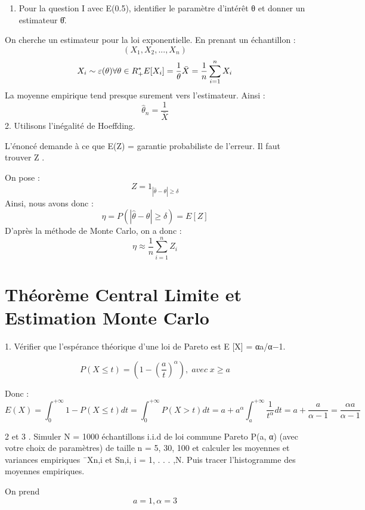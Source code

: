 \documentclass[
]{article}
\providecommand{\tightlist}{%
  \setlength{\itemsep}{0pt}\setlength{\parskip}{0pt}}
\begin{document}
\begin{enumerate}
\def\labelenumi{\arabic{enumi}.}
\tightlist
\item
  Pour la question I avec E(0.5), identifier le paramètre d'intérêt θ et
  donner un estimateur θ̂.
\end{enumerate}

On cherche un estimateur pour la loi exponentielle. En prenant un
échantillon : \[
(X_1,X_2,...,X_n)
\] \[
X_i \sim \varepsilon(\theta) 
\\
\forall \theta \in R^*_+
\\
E[X_i] = \frac{1}{\theta}
\\
\bar{X} = \frac{1}{n} \sum_{i=1}^{n} X_i
\] La moyenne empirique tend presque surement vers l'estimateur. Ainsi :
\[
\hat{\theta}_n = \frac{1}{\bar{X}}
\] 2. Utilisons l'inégalité de Hoeffding.

L'énoncé demande à ce que E(Z) = garantie probabiliste de l'erreur. Il
faut trouver Z .

On pose : \[
Z = 1_{|\hat{\theta} - \theta| \ge \delta} 
\] Ainsi, nous avons donc : \[
\eta = P(|\hat{\theta} - \theta| \ge \delta) = E[Z]
\] D'après la méthode de Monte Carlo, on a donc : \[
\eta \approx  \frac{1}{n} \sum_{i=1}^n Z_i
\]

\hypertarget{thuxe9oruxe8me-central-limite-et-estimation-monte-carlo}{%
\section{Théorème Central Limite et Estimation Monte
Carlo}\label{thuxe9oruxe8me-central-limite-et-estimation-monte-carlo}}

1. Vérifier que l'espérance théorique d'une loi de Pareto est E {[}X{]}
= αa/α−1.

\[
P(X\le t)= (1-\left( \frac{a}{t} \right)^{\alpha}) , \;avec \;x \ge a
\]

Donc : \[
E(X) = \int_0^{+\infty} 1-P(X \le t)dt =
\int_0^{+\infty} P(X    > t) dt =
a+a^{\alpha}\int_a^{+\infty}\frac{1}{t^{\alpha}}dt=a + \frac{a}{\alpha -1} =
\frac{\alpha a}{\alpha -1}
\]

2 et 3 . Simuler N = 1000 échantillons i.i.d de loi commune Pareto P(a,
α) (avec votre choix de paramètres) de taille n = 5, 30, 100 et calculer
les moyennes et variances empiriques ¯Xn,i et Sn,i, i = 1, . . . ,N.
Puis tracer l'histogramme des moyennes empiriques.

On prend \[ a = 1, \alpha = 3 \]
\end{document}
